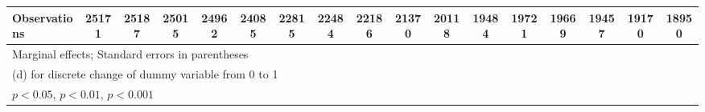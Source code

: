 {\begin{tabular}{l*{16}{c}}
\hline
Observations        &       25171         &       25187         &       25015         &       24962         &       24085         &       22815         &       22484         &       22186         &       21370         &       20118         &       19484         &       19721         &       19669         &       19457         &       19170         &       18950         \\
\hline\hline
\multicolumn{17}{l}{\footnotesize Marginal effects; Standard errors in parentheses}\\
\multicolumn{17}{l}{\footnotesize  (d) for discrete change of dummy variable from 0 to 1}\\
\multicolumn{17}{l}{\footnotesize \sym{*} \(p<0.05\), \sym{**} \(p<0.01\), \sym{***} \(p<0.001\)}\\
\end{tabular}
}

